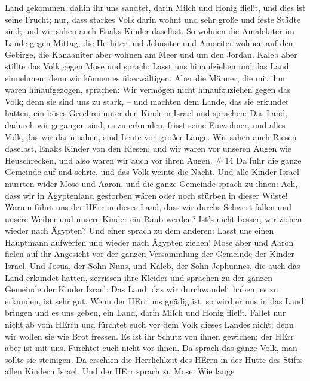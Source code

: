 Land gekommen, dahin ihr uns sandtet, darin Milch und Honig fließt, und
dies ist seine Frucht;  nur, dass starkes Volk darin wohnt
und sehr große und feste Städte sind; und wir sahen auch Enaks Kinder
daselbst.  So wohnen die Amalekiter im Lande gegen Mittag,
die Hethiter und Jebusiter und Amoriter wohnen auf dem Gebirge, die
Kanaaniter aber wohnen am Meer und um den Jordan.  Kaleb
aber stillte das Volk gegen Mose und sprach: Lasst uns hinaufziehen und
das Land einnehmen; denn wir können es überwältigen.  Aber
die Männer, die mit ihm waren hinaufgezogen, sprachen: Wir vermögen
nicht hinaufzuziehen gegen das Volk; denn sie sind uns zu stark, --
 und machten dem Lande, das sie erkundet hatten, ein böses
Geschrei unter den Kindern Israel und sprachen: Das Land, dadurch wir
gegangen sind, es zu erkunden, frisst seine Einwohner, und alles Volk,
das wir darin sahen, sind Leute von großer Länge.  Wir
sahen auch Riesen daselbst, Enaks Kinder von den Riesen; und wir waren
vor unseren Augen wie Heuschrecken, und also waren wir auch vor ihren
Augen. \# 14  Da fuhr die ganze Gemeinde auf und schrie, und
das Volk weinte die Nacht.  Und alle Kinder Israel murrten
wider Mose und Aaron, und die ganze Gemeinde sprach zu ihnen: Ach, dass
wir in Ägyptenland gestorben wären oder noch stürben in dieser Wüste!
 Warum führt uns der HErr in dieses Land, dass wir durchs
Schwert fallen und unsere Weiber und unsere Kinder ein Raub werden?
Ist's nicht besser, wir ziehen wieder nach Ägypten?  Und
einer sprach zu dem anderen: Lasst uns einen Hauptmann aufwerfen und
wieder nach Ägypten ziehen!  Mose aber und Aaron fielen auf
ihr Angesicht vor der ganzen Versammlung der Gemeinde der Kinder Israel.
 Und Josua, der Sohn Nuns, und Kaleb, der Sohn Jephunnes,
die auch das Land erkundet hatten, zerrissen ihre Kleider 
und sprachen zu der ganzen Gemeinde der Kinder Israel: Das Land, das wir
durchwandelt haben, es zu erkunden, ist sehr gut.  Wenn der
HErr uns gnädig ist, so wird er uns in das Land bringen und es uns
geben, ein Land, darin Milch und Honig fließt.  Fallet nur
nicht ab vom HErrn und fürchtet euch vor dem Volk dieses Landes nicht;
denn wir wollen sie wie Brot fressen. Es ist ihr Schutz von ihnen
gewichen; der HErr aber ist mit uns. Fürchtet euch nicht vor ihnen.
 Da sprach das ganze Volk, man sollte sie steinigen. Da
erschien die Herrlichkeit des HErrn in der Hütte des Stifts allen
Kindern Israel.  Und der HErr sprach zu Mose: Wie lange
